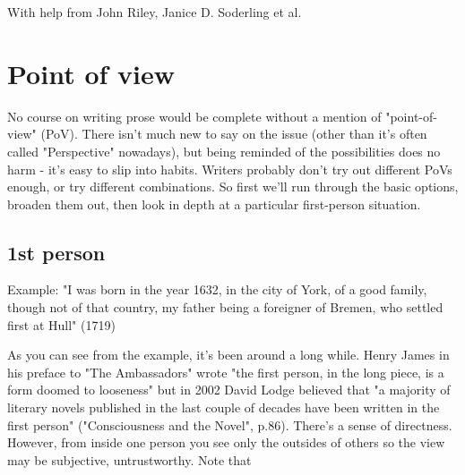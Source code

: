 \documentclass[11pt]{article}
\begin{document}
With help from John Riley, Janice D. Soderling et al.



\newpage
\section{Point of view}
No course on writing prose would be complete without a mention of "point-of-view" (PoV). There isn't much new to say on the issue (other than it's often called "Perspective" nowadays), but being reminded of the possibilities does no harm - it's easy to slip into habits. Writers probably don't try out different PoVs enough, or try different combinations. So first we'll run through the basic options, broaden them out, then look in depth at a particular first-person situation.



\subsection*{1st person}
Example: "I was born in the year 1632, in the city of York, of a good family, though not of that country, my father being a foreigner of Bremen, who settled first at Hull" (1719)


As you can see from the example, it's been around a long while. Henry James in his preface to "The Ambassadors" wrote "the first person, in the long piece, is a form doomed to looseness"  but in 2002 David Lodge believed that "a majority of literary novels published in the last couple of decades have been written in the first person" ("Consciousness and the Novel", p.86). There's a sense of directness. However, from inside one person you see only the outsides of others so the view may be subjective, untrustworthy. Note that
\end{document}
